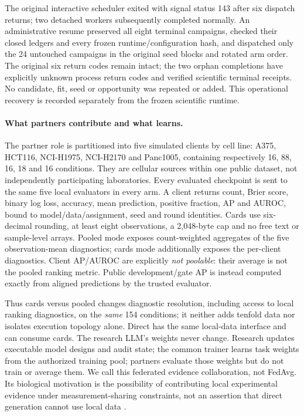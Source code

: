 The original interactive scheduler exited with signal status 143 after
six dispatch returns; two detached workers subsequently completed normally.
An administrative resume preserved all eight terminal campaigns, checked
their closed ledgers and every frozen runtime/configuration hash, and
dispatched only the 24 untouched campaigns in the original seed blocks and
rotated arm order. The original six return codes remain intact; the two
orphan completions have explicitly unknown process return codes and verified
scientific terminal receipts. No candidate, fit, seed or opportunity was
repeated or added. This operational recovery is recorded separately from
the frozen scientific runtime.

\paragraph{What partners contribute and what learns.}
The partner role is partitioned into five simulated clients by cell line:
A375, HCT116, NCI-H1975, NCI-H2170 and Panc1005, containing respectively
16, 88, 16, 18 and 16 conditions. They are cellular sources within one public
dataset, not independently participating laboratories. Every evaluated
checkpoint is sent to the same five local evaluators in every arm.
A client returns count, Brier score, binary log loss, accuracy, mean
prediction, positive fraction, AP and AUROC, bound to model/data/assignment,
seed and round identities. Cards use six-decimal rounding, at least eight
observations, a 2,048-byte cap and no free text or sample-level arrays.
Pooled mode exposes count-weighted aggregates of the five observation-mean
diagnostics; cards mode additionally exposes the per-client diagnostics.
Client AP/AUROC are explicitly \emph{not poolable}: their average is not
the pooled ranking metric. Public development/gate AP is instead computed
exactly from aligned predictions by the trusted evaluator.

Thus cards versus pooled changes diagnostic resolution, including access
to local ranking diagnostics, on the \emph{same} 154 conditions; it neither
adds tenfold data nor isolates execution topology alone. Direct has the
same local-data interface and can consume cards. The research LLM's weights
never change. Research updates executable model designs and audit state;
the common trainer learns task weights from the authorized training pool;
partners evaluate those weights but do not train or average them. We call
this federated evidence collaboration, not FedAvg. Its biological motivation
is the possibility of contributing local experimental evidence under
measurement-sharing constraints, not an assertion that direct generation
cannot use local data \citep{Sheller2020}.


